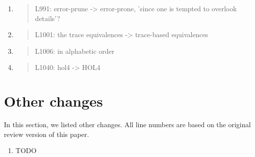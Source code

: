 \begin{enumerate}
\item \begin{quote}
    L991: error-prune -> error-prone, ’since one is tempted to overlook details’?
  \end{quote}

\item \begin{quote}
    L1001: the trace equivalences -> trace-based equivalences
  \end{quote}

\item \begin{quote}
    L1006: in alphabetic order
  \end{quote}

\item \begin{quote}
    L1040: hol4 -> HOL4
  \end{quote}

\end{enumerate}

\section*{Other changes}

In this section, we listed other changes. All line numbers are based
on the original review version of this paper.

\begin{enumerate}
\item TODO
\end{enumerate}
